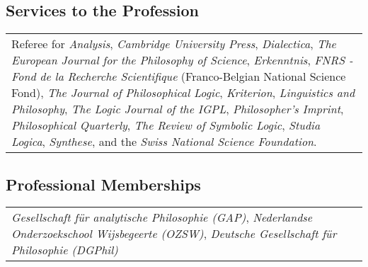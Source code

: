 \subsection*{Services to the Profession}
\begin{tabular}{p{\linewidth}}
  Referee for
  \emph{Analysis},
  \emph{Cambridge University Press},
  \emph{Dialectica},
  \emph{The European Journal for the Philosophy of Science},
  \emph{Erkenntnis},
  \emph{FNRS - Fond de la Recherche Scientifique} (Franco-Belgian National Science Fond),
  \emph{The Journal of Philosophical Logic},
  \emph{Kriterion},
  \emph{Linguistics and Philosophy},
  \emph{The Logic Journal of the IGPL},
  \emph{Philosopher's Imprint},
  \emph{Philosophical Quarterly},
  \emph{The Review of Symbolic Logic},
  \emph{Studia Logica},
  \emph{Synthese},
  and the \emph{Swiss National Science Foundation}.

\end{tabular}

\subsection*{Professional Memberships}
\begin{tabular}{p{\linewidth}}
  \emph{Gesellschaft f\"ur analytische Philosophie (GAP)}, \emph{Nederlandse Onderzoekschool Wijsbegeerte (OZSW)}, \emph{Deutsche Gesellschaft f\"ur Philosophie (DGPhil)}\\
\end{tabular}
